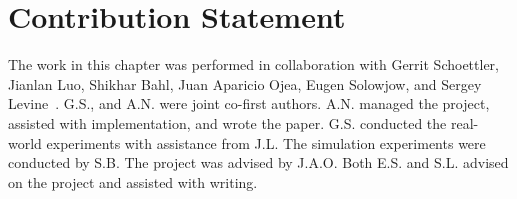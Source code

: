 










\section{Contribution Statement}

The work in this chapter was performed in collaboration with Gerrit Schoettler, Jianlan Luo, Shikhar Bahl, Juan Aparicio Ojea, Eugen Solowjow, and Sergey Levine~\citep{schoettler2019insertion}. G.S., and A.N. were joint co-first authors. A.N. managed the project, assisted with implementation, and wrote the paper. G.S. conducted the real-world experiments with assistance from J.L. The simulation experiments were conducted by S.B. The project was advised by J.A.O. Both E.S. and S.L. advised on the project and assisted with writing.


% 
% 

% 

